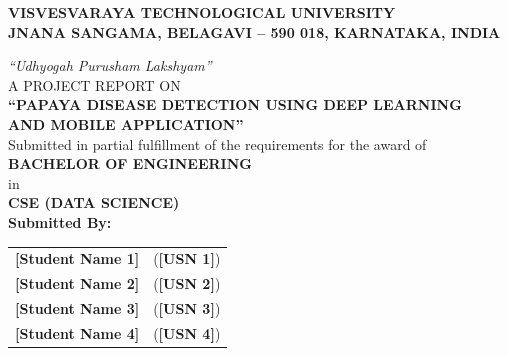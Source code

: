 \documentclass[12pt,a4paper]{report}
\begin{document}


\begin{titlepage}
\begin{center}

{\Large\bfseries VISVESVARAYA TECHNOLOGICAL UNIVERSITY}\\[2pt]
{\normalsize\bfseries JNANA SANGAMA, BELAGAVI -- 590 018, KARNATAKA, INDIA}\\[10pt]

\begin{figure}[h!]
\centering
\end{figure}

{\normalsize\textit{``Udhyogah Purusham Lakshyam''}}\\[15pt]

{\large A PROJECT REPORT ON}\\[10pt]

{\Large\bfseries ``PAPAYA DISEASE DETECTION USING DEEP LEARNING\\
AND MOBILE APPLICATION''}\\[15pt]

{\normalsize Submitted in partial fulfillment of the requirements for the award of}\\[5pt]
{\normalsize\bfseries BACHELOR OF ENGINEERING}\\[2pt]
{\normalsize in}\\[2pt]
{\normalsize\bfseries CSE (DATA SCIENCE)}\\[15pt]

{\normalsize\bfseries Submitted By:}\\[10pt]

\begin{tabular}{ll}
\textbf{[Student Name 1]} & (\textbf{[USN 1]}) \\[4pt]
\textbf{[Student Name 2]} & (\textbf{[USN 2]}) \\[4pt]
\textbf{[Student Name 3]} & (\textbf{[USN 3]}) \\[4pt]
\textbf{[Student Name 4]} & (\textbf{[USN 4]}) \\
\end{tabular}\\[15pt]


\end{center}
\end{titlepage}
\end{document}
